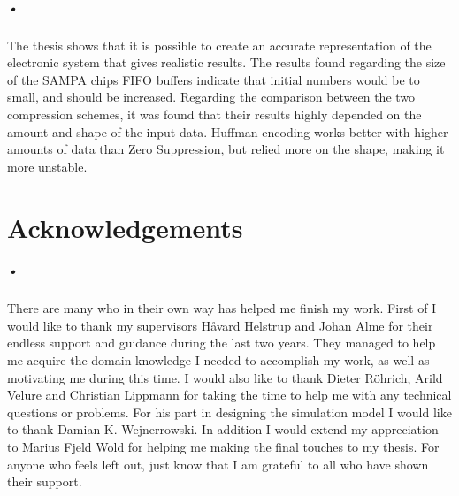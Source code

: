 \documentclass[a4paper, 12pt]{report}
\begin{document}
\paragraph{•}
The thesis shows that it is possible to create an accurate representation of the electronic system that gives realistic results.
The results found regarding the size of the SAMPA chips FIFO buffers indicate that initial numbers would be to small, and should be increased.
Regarding the comparison between the two compression schemes, it was found that their results highly depended on the amount and shape of the input data.
Huffman encoding works better with higher amounts of data than Zero Suppression, but relied more on the shape, making it more unstable.

\newpage
\mbox{}
\thispagestyle{empty}
\newpage

\chapter*{Acknowledgements}

\paragraph{•}
There are many who in their own way has helped me finish my work.
First of I would like to thank my supervisors H\r{a}vard Helstrup and Johan Alme for their endless support and guidance during the last two years.
They managed to help me acquire the domain knowledge I needed to accomplish my work, as well as motivating me during this time.
I would also like to thank Dieter R\"{o}hrich, Arild Velure and Christian Lippmann for taking the time to help me with any technical questions or problems.
For his part in designing the simulation model I would like to thank Damian K. Wejnerrowski.
In addition I would extend my appreciation to Marius Fjeld Wold for helping me making the final touches to my thesis.
For anyone who feels left out, just know that I am grateful to all who have shown their support.

{}
\tableofcontents

\newpage
{}
{}
\listoffigures

\newpage
{}
{}
\listoftables

\newpage
{}
{}
\lstlistoflistings
\newpage
\end{document}
